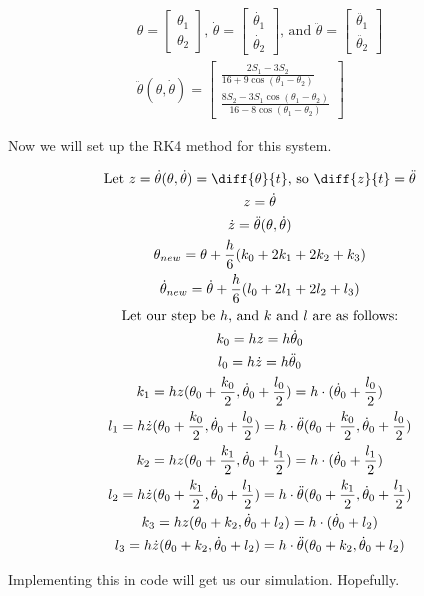 \documentclass[]{article}
\begin{document}
\begin{gather*}
	\theta = 
	\begin{bmatrix}
		\theta_1 \\
		\theta_2
	\end{bmatrix} \text{, }
	\dot{\theta} = 
	\begin{bmatrix}
		\dot{\theta_1} \\
		\dot{\theta_2}
	\end{bmatrix} \text{, and }
	\ddot{\theta} =
	\begin{bmatrix}
		\ddot{\theta_1} \\
		\ddot{\theta_2}
	\end{bmatrix} \\
	\ddot{\theta}(\theta, \dot{\theta}) =
	\begin{bmatrix}
		\frac{2S_1 - 3S_2}{16 + 9\cos(\theta_1 - \theta_2)} \\
		\frac{8S_2 - 3S_1\cos(\theta_1 - \theta_2)}{16 - 8\cos(\theta_1 - \theta_2)}
	\end{bmatrix}
\end{gather*}

Now we will set up the RK4 method for this system.

\begin{gather*}
	\text{Let } z = \dot{\theta}(\theta, \dot{\theta}) = \diff{\theta}{t} \text{, so } \diff{z}{t} = \ddot{\theta} \\
	z = \dot{\theta} \\
	\dot{z} = \ddot{\theta}(\theta, \dot{\theta}) \\
	\theta_{new} = \theta + \frac{h}{6}(k_0 + 2k_1 + 2k_2 + k_3) \\
	\dot{\theta}_{new} = \dot{\theta} + \frac{h}{6}(l_0 + 2l_1 + 2l_2 + l_3) \\
	\text{Let our step be $h$, and $k$ and $l$ are as follows:}\\
	k_0 = hz = h\dot{\theta}_0 \\
	l_0 = h\dot{z} = h\ddot{\theta}_0 \\
	k_1 = hz(\theta_0 + \frac{k_0}{2}, \dot{\theta}_0 + \frac{l_0}{2}) = h\cdot(\dot{\theta}_0 + \frac{l_0}{2}) \\
	l_1 = h\dot{z}(\theta_0 + \frac{k_0}{2}, \dot{\theta}_0 + \frac{l_0}{2}) = h\cdot\ddot{\theta}(\theta_0 + \frac{k_0}{2}, \dot{\theta}_0 + \frac{l_0}{2}) \\
	k_2 = hz(\theta_0 + \frac{k_1}{2}, \dot{\theta}_0 + \frac{l_1}{2}) = h\cdot(\dot{\theta}_0 + \frac{l_1}{2}) \\
	l_2 = h\dot{z}(\theta_0 + \frac{k_1}{2}, \dot{\theta}_0 + \frac{l_1}{2}) = h\cdot\ddot{\theta}(\theta_0 + \frac{k_1}{2}, \dot{\theta}_0 + \frac{l_1}{2}) \\
	k_3 = hz(\theta_0 + k_2, \dot{\theta}_0 + l_2) = h\cdot(\dot{\theta}_0 + l_2) \\
	l_3 = h\dot{z}(\theta_0 + k_2, \dot{\theta}_0 + l_2) = h\cdot\ddot{\theta}(\theta_0 + k_2, \dot{\theta}_0 + l_2)
\end{gather*}

Implementing this in code will get us our simulation. Hopefully.
\end{document}
